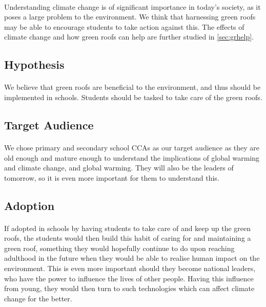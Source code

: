 \documentclass[a4paper]{article}
\begin{document}
\begin{multicols}{2}
  \paragraph{} Understanding climate change is of significant importance
  in today's society, as it poses a large problem to the environment.
  We think that harnessing green roofs may be able to encourage students
  to take action against this. The effects of climate change and how green
  roofs can help are further studied in \cref{sec:grhelp}.

  \subsection{Hypothesis}
  \paragraph{} We believe that green roofs are beneficial to the environment, and thus should be implemented in schools. Students should be tasked to take care of the green roofs.
  \subsection{Target Audience} \label{ssec:target-aud}
  \paragraph{} We chose primary and secondary school CCAs as our target audience as
  they are old enough and mature enough to understand the implications
  of global warming and climate change, and global warming. They will
  also be the leaders of tomorrow, so it is even more important for them
  to understand this.


  \subsection{Adoption}
  \paragraph{} If adopted in schools by having students to take care
  of and keep up the green roofs, the students would then build this
  habit of caring for and maintaining a green roof, something they would
  hopefully continue to do upon reaching adulthood in the future when
  they would be able to realise human impact on the environment. This is
  even more important should they become national leaders, who have the
  power to influence the lives of other people. Having this influence
  from young, they would then turn to such technologies which can affect
  climate change for the better.


\end{multicols}
\end{document}
